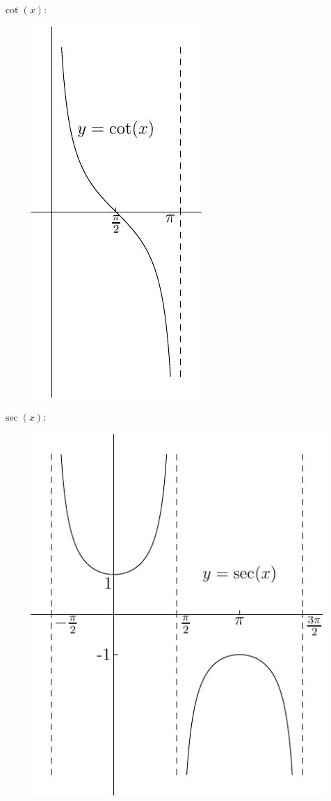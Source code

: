 $\cot(x)$:
\begin{figure}[H]
\centering
\includegraphics{cot.pdf}
\end{figure}
$\sec(x)$:
\begin{figure}[H]
\centering
\includegraphics{sec.pdf}
\end{figure}
